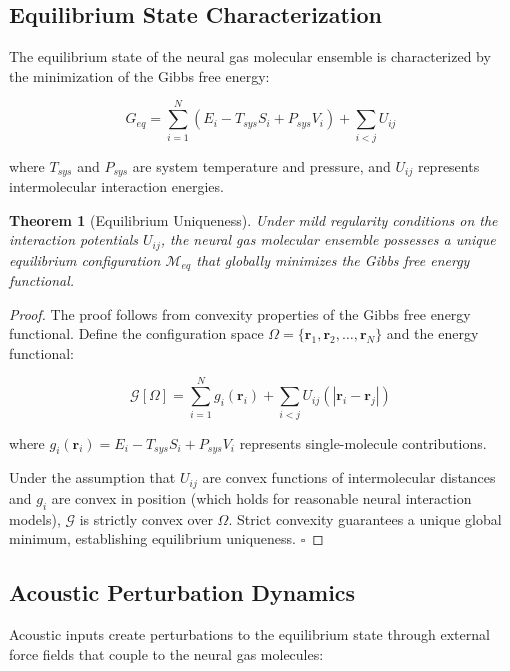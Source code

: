 \documentclass[12pt,a4paper]{article}
\newtheorem{theorem}{Theorem}[section]
\begin{document}
\subsection{Equilibrium State Characterization}

The equilibrium state of the neural gas molecular ensemble is characterized by the minimization of the Gibbs free energy:

\begin{equation}
G_{eq} = \sum_{i=1}^{N} (E_i - T_{sys}S_i + P_{sys}V_i) + \sum_{i<j} U_{ij}
\end{equation}

where $T_{sys}$ and $P_{sys}$ are system temperature and pressure, and $U_{ij}$ represents intermolecular interaction energies.

\begin{theorem}[Equilibrium Uniqueness]
Under mild regularity conditions on the interaction potentials $U_{ij}$, the neural gas molecular ensemble possesses a unique equilibrium configuration $\mathcal{M}_{eq}$ that globally minimizes the Gibbs free energy functional.
\end{theorem}

\begin{proof}
The proof follows from convexity properties of the Gibbs free energy functional. Define the configuration space $\Omega = \{\mathbf{r}_1, \mathbf{r}_2, \ldots, \mathbf{r}_N\}$ and the energy functional:

\begin{equation}
\mathcal{G}[\Omega] = \sum_{i=1}^{N} g_i(\mathbf{r}_i) + \sum_{i<j} U_{ij}(|\mathbf{r}_i - \mathbf{r}_j|)
\end{equation}

where $g_i(\mathbf{r}_i) = E_i - T_{sys}S_i + P_{sys}V_i$ represents single-molecule contributions.

Under the assumption that $U_{ij}$ are convex functions of intermolecular distances and $g_i$ are convex in position (which holds for reasonable neural interaction models), $\mathcal{G}$ is strictly convex over $\Omega$. Strict convexity guarantees a unique global minimum, establishing equilibrium uniqueness. $\square$
\end{proof}

\subsection{Acoustic Perturbation Dynamics}

Acoustic inputs create perturbations to the equilibrium state through external force fields that couple to the neural gas molecules:
\end{document}
